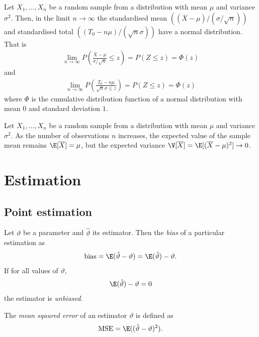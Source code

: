 \documentclass{article}
\renewcommand{\bar}{\overline}
\begin{document}
\begin{theorem}
	Let $X_1,...,X_n$ be a random sample from a distribution with mean
	$\mu$ and variance $\sigma^2$. Then, in the limit $n\to\infty$ the
	standardised mean $((\bar X - \mu) / (\sigma / \sqrt{n}))$ and
	standardised total $((T_0 - n\mu)/(\sqrt{n}\sigma))$ have a normal
	distribution. That is
	\begin{align*}
		\lim_{n\to\infty}P\left(\frac{\bar X - \mu}{\sigma / \sqrt{n}}\leq z\right)
		= P(Z\leq z) = \Phi(z)
	\end{align*}
	and
	\begin{align*}
		\lim_{n\to\infty}P\left(\frac{\bar T_0-n\mu}{\sqrt{n}\sigma\leq z}\right)
		= P(Z\leq z) = \Phi(z)
	\end{align*}
	where $\Phi$ is the cumulative distribution function of a normal distribution
	with mean $0$ and standard deviation $1$.
\end{theorem}

\begin{theorem}
	Let $X_1, ..., X_n$ be a random sample from a distribution with mean
	$\mu$ and variance $\sigma^2$. As the number of observations $n$
	increases, the expected value of the sample mean remains $\E[\bar X]=\mu$,
	but the expected variance $\V[\bar X]=\E[(\bar X - \mu)^2]\to 0$.
\end{theorem}


\section{Estimation}


\subsection{Point estimation}

\begin{definition}
	Let $\vartheta$ be a parameter and $\hat\vartheta$ its estimator.
	Then the \emph{bias} of a particular estimation as
	\begin{align*}
		\text{bias}=\E(\hat\vartheta-\vartheta)=\E(\hat\vartheta)-\vartheta.
	\end{align*}
	If for all values of $\vartheta$,
	\begin{align*}
		\E(\hat\vartheta)-\vartheta = 0
	\end{align*}
	the estimator is \emph{unbiased}.
\end{definition}

\begin{definition}
	The \emph{mean sqaured error} of an estimator $\vartheta$
	is defined as
	\begin{align*}
		\text{MSE} = \E((\hat\vartheta-\vartheta)^2).
	\end{align*}
\end{definition}
\end{document}
